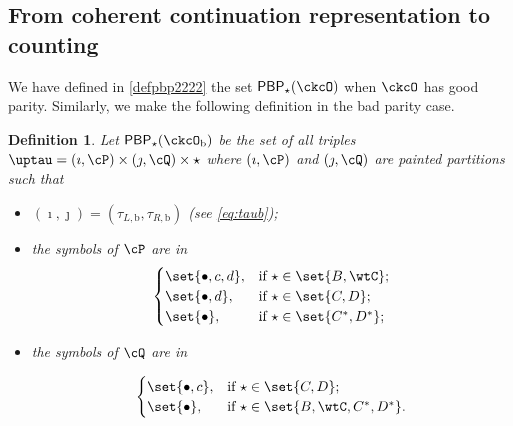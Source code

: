 \documentclass[12pt]{amsart}
\def\abs#1{\left|{#1}\right|}
\numberwithin{equation}{section}
\newtheorem{defn}[thm]{Definition}
\theoremstyle{remark}
\def\half{{\tfrac{1}{2}}}
\def\Unip{\mathrm{Unip}}
\def\cupcol{{\stackrel{c}{\sqcup}}}
\def\cupcol{{\,\stackrel{c}{\sqcup}\,}}
\def\ckcOb{\ckcO_{\mathrm b}}
\def\ckcOpb{\ckcO'_{\mathrm b}}
\def\Gpb{G'_{\mathrm b}}
\def\PBPs{\mathsf{PBP}_{\star}}
\begin{document}
\subsection{From coherent continuation representation to counting}




We have defined in \eqref{defpbp2222} the set $\PBPs(\ckcO)$ when $\ckcO$ has good parity. Similarly, we make the following definition in the bad parity case.
\begin{defn}
  Let $\PBPs(\ckcOb)$ be the set of all triples
  $\uptau = (\imath,\cP)\times(\jmath,\cQ)\times \star $ where $(\imath,\cP)$ and
  $(\jmath,\cQ)$ are painted partitions such that
  \begin{itemize}
    \item $(\imath,\jmath) = (\tau_{L,\mathrm b},\tau_{R,\mathrm b})$ (see \eqref{eq:taub});
    \item the symbols of $\cP$ are in
          \[
          \begin{cases}
            \set{\bullet, c,d},  & \text{if } \star\in \set{B,\wtC}; \\
            \set{\bullet, d},  & \text{if } \star\in \set{C,D};\\
            \set{\bullet},  & \text{if } \star\in \set{C^{*},D^{*}};\\
          \end{cases}
          \]
    \item the symbols of $\cQ$ are in

          \[
          \begin{cases}
            \set{\bullet, c},  & \text{if } \star\in \set{C,D};\\
            \set{\bullet},  & \text{if } \star\in \set{B,\wtC, C^{*},D^{*}}.\\
          \end{cases}
          \]
  \end{itemize}
\end{defn}


\end{document}
